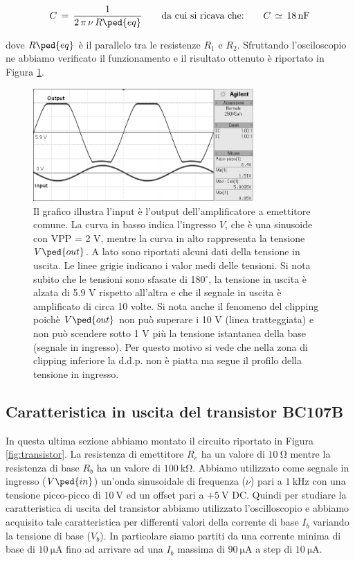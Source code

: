 \begin{equation}
	C \,=\, \frac{1}{2\,\pi\,\nu\,R\ped{eq}} \qquad\text{da cui si ricava che:}\qquad C \,\simeq\,\SI{18}{\nano\farad}
\end{equation}

dove $R\ped{eq}$ è il parallelo tra le resistenze $R_1$ e $R_2$.
Sfruttando l'osciloscopio ne abbiamo verificato il funzionamento e il risultato ottenuto è riportato in Figura \ref{fig:amp}.

\begin{figure}[t!]
	\centering
	\includegraphics[width=0.75\textwidth]{g.png}
	\caption{Il grafico illustra l'input è l'output dell'amplificatore a emettitore comune. La curva in basso indica l'ingresso $V$,
		che è una sinusoide con VPP = 2 V, mentre la curva in alto rappresenta la tensione $V\ped{out}$. A lato sono riportati alcuni dati della tensione in uscita.
		Le linee grigie indicano i valor medi delle tensioni. Si nota subito che le tensioni sono
		sfasate di 180$^\circ$, la tensione in uscita è alzata di 5.9 V rispetto all'altra e che il segnale in uscita è amplificato di circa 10 volte.
		Si nota anche il fenomeno del clipping poichè $V\ped{out}$ non può superare i 10 V (linea tratteggiata) e non può scendere sotto 1 V più
		la tensione istantanea della base (segnale in ingresso). Per questo motivo si vede che nella zona di clipping inferiore la d.d.p.
		non è piatta ma segue il profilo della tensione in ingresso.}
	\label{fig:amp}
\end{figure}

\subsection*{Caratteristica in uscita del transistor BC107B}

In questa ultima sezione abbiamo montato il circuito riportato in Figura \ref{fig:transistor}. La resistenza di emettitore $R_e$ ha un valore di $\SI{10}{\ohm}$ mentre la resistenza di base $R_b$ ha un valore di $\SI{100}{\kilo\ohm}$. Abbiamo utilizzato come segnale in ingresso ($V\ped{in}$) un'onda sinusoidale di frequenza ($\nu$) pari a $\SI{1}{\kilo\hertz}$ con una tensione picco-picco di $\SI{10}{\volt}$ ed un offset pari a $+\SI{5}{\volt}$ DC.
Quindi per studiare la caratteristica di uscita del transistor abbiamo utilizzato l'oscilloscopio e abbiamo acquisito tale caratteristica per differenti valori della corrente di base $I_b$ variando la tensione di base ($V_b$). In particolare siamo partiti da una corrente minima di base di $\SI{10}{\micro\ampere}$ fino ad arrivare ad una $I_b$ massima di $\SI{90}{\micro\ampere}$ a step di $\SI{10}{\micro\ampere}$.

